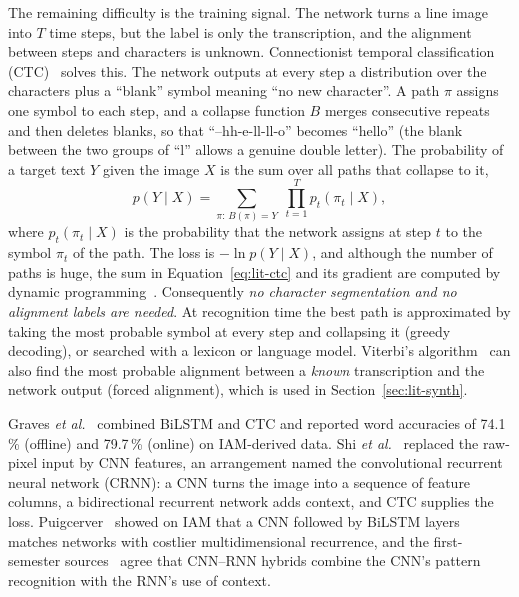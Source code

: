 The remaining difficulty is the training signal. The network turns a line image into $T$ time steps, but the label is only the transcription, and the alignment between steps and characters is unknown. Connectionist temporal classification (CTC)~\cite{graves2006} solves this. The network outputs at every step a distribution over the characters plus a ``blank'' symbol meaning ``no new character''. A path $\pi$ assigns one symbol to each step, and a collapse function $B$ merges consecutive repeats and then deletes blanks, so that ``--hh-e-ll-ll-o'' becomes ``hello'' (the blank between the two groups of ``l'' allows a genuine double letter). The probability of a target text $Y$ given the image $X$ is the sum over all paths that collapse to it,
\begin{equation}
p(Y\mid X)=\sum_{\pi:\,B(\pi)=Y}\;\prod_{t=1}^{T}p_t(\pi_t\mid X),
\label{eq:lit-ctc}
\end{equation}
where $p_t(\pi_t\mid X)$ is the probability that the network assigns at step $t$ to the symbol $\pi_t$ of the path. The loss is $-\ln p(Y\mid X)$, and although the number of paths is huge, the sum in Equation~\ref{eq:lit-ctc} and its gradient are computed by dynamic programming~\cite{graves2006}. Consequently \emph{no character segmentation and no alignment labels are needed}. At recognition time the best path is approximated by taking the most probable symbol at every step and collapsing it (greedy decoding), or searched with a lexicon or language model. Viterbi's algorithm~\cite{viterbi1967} can also find the most probable alignment between a \emph{known} transcription and the network output (forced alignment), which is used in Section~\ref{sec:lit-synth}.

Graves \emph{et al.}~\cite{graves2009} combined BiLSTM and CTC and reported word accuracies of 74.1\,\% (offline) and 79.7\,\% (online) on IAM-derived data. Shi \emph{et al.}~\cite{shi2017} replaced the raw-pixel input by CNN features, an arrangement named the convolutional recurrent neural network (CRNN): a CNN turns the image into a sequence of feature columns, a bidirectional recurrent network adds context, and CTC supplies the loss. Puigcerver~\cite{puigcerver2017} showed on IAM that a CNN followed by BiLSTM layers matches networks with costlier multidimensional recurrence, and the first-semester sources~\cite{ma2023,kumar2024,hemanth2022} agree that CNN--RNN hybrids combine the CNN's pattern recognition with the RNN's use of context.

